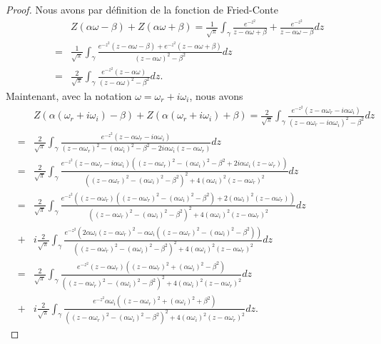  \begin{proof}
Nous avons par définition de la fonction de Fried-Conte
\begin{eqnarray*}
&&Z(\alpha\omega-\beta)+Z(\alpha\omega+\beta)=\frac{1}{\sqrt{\pi}}\int_\gamma\frac{e^{-z^2}}{z-\alpha\omega+\beta}+\frac{e^{-z^2}}{z-\alpha\omega-\beta}dz\\
&=&\frac{1}{\sqrt{\pi}}\int_\gamma\frac{e^{-z^2}(z-\alpha\omega-\beta)+e^{-z^2}(z-\alpha\omega+\beta)}{(z-\alpha\omega)^2-\beta^2}dz\\
&=&\frac{2}{\sqrt{\pi}}\int_\gamma\frac{e^{-z^2}(z-\alpha\omega)}{(z-\alpha\omega)^2-\beta^2}dz.
\end{eqnarray*}
Maintenant, avec la notation $\omega=\omega_r+i\omega_i$, nous avons
\begin{eqnarray*}
&&Z(\alpha(\omega_r+i\omega_i)-\beta)+Z(\alpha(\omega_r+i\omega_i)+\beta)=\frac{2}{\sqrt{\pi}}\int_\gamma\frac{e^{-z^2}(z-\alpha\omega_r-i\alpha\omega_i)}{(z-\alpha\omega_r-i\alpha\omega_i)^2-\beta^2}dz\\
&=&\frac{2}{\sqrt{\pi}}\int_\gamma\frac{e^{-z^2}(z-\alpha\omega_r-i\alpha\omega_i)}{(z-\alpha\omega_r)^2-(\alpha\omega_i)^2-\beta^2-2i\alpha\omega_i(z-\alpha\omega_r)}dz\\
&=&\frac{2}{\sqrt{\pi}}\int_\gamma\frac{e^{-z^2}(z-\alpha\omega_r-i\alpha\omega_i)\left((z-\alpha\omega_r)^2-(\alpha\omega_i)^2-\beta^2+2i\alpha\omega_i(z-\omega_r)\right)}{\left((z-\alpha\omega_r)^2-(\alpha\omega_i)^2-\beta^2\right)^2+4\left(\alpha\omega_i\right)^2(z-\alpha\omega_r)^2}dz\\
&=&\frac{2}{\sqrt{\pi}}\int_\gamma\frac{e^{-z^2}\left((z-\alpha\omega_r)\left((z-\alpha\omega_r)^2-(\alpha\omega_i)^2-\beta^2\right)+2(\alpha\omega_i)^2(z-\alpha\omega_r)\right)}{\left((z-\alpha\omega_r)^2-(\alpha\omega_i)^2-\beta^2\right)^2+4\left(\alpha\omega_i\right)^2(z-\alpha\omega_r)^2}dz\\
&+&i\frac{2}{\sqrt{\pi}}\int_\gamma\frac{e^{-z^2}\left(2\alpha\omega_i(z-\alpha\omega_r)^2-\alpha\omega_i\left((z-\alpha\omega_r)^2-(\alpha\omega_i)^2-\beta^2\right)\right)}{\left((z-\alpha\omega_r)^2-(\alpha\omega_i)^2-\beta^2\right)^2+4\left(\alpha\omega_i\right)^2(z-\alpha\omega_r)^2}dz\\
&=&\frac{2}{\sqrt{\pi}}\int_\gamma\frac{e^{-z^2}(z-\alpha\omega_r)\left((z-\alpha\omega_r)^2+(\alpha\omega_i)^2-\beta^2\right)}{\left((z-\alpha\omega_r)^2-(\alpha\omega_i)^2-\beta^2\right)^2+4\left(\alpha\omega_i\right)^2(z-\alpha\omega_r)^2}dz\\
&+&i\frac{2}{\sqrt{\pi}}\int_\gamma\frac{e^{-z^2}\alpha\omega_i\left((z-\alpha\omega_r)^2+(\alpha\omega_i)^2+\beta^2\right)}{\left((z-\alpha\omega_r)^2-(\alpha\omega_i)^2-\beta^2\right)^2+4\left(\alpha\omega_i\right)^2(z-\alpha\omega_r)^2}dz.

\end{eqnarray*}
\end{proof}
